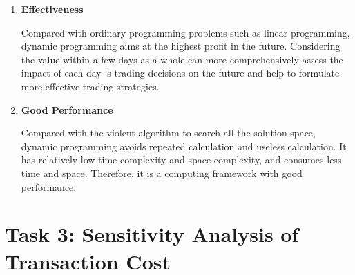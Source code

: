 \documentclass{mcmthesis}
\begin{document}
\begin{enumerate}
\item \textbf{Effectiveness}
\par Compared with ordinary programming problems such as linear programming, dynamic programming aims at the highest profit in the future. Considering the value within a few days as a whole can more comprehensively assess the impact of each day 's trading decisions on the future and help to formulate more effective trading strategies.
\item \textbf{Good Performance}
\par Compared with the violent algorithm to search all the solution space, dynamic programming avoids repeated calculation and useless calculation. It has relatively low time complexity and space complexity, and consumes less time and space. Therefore, it is a computing framework with good performance.
\end{enumerate}

\section{Task 3: Sensitivity Analysis of Transaction Cost}
\end{document}
